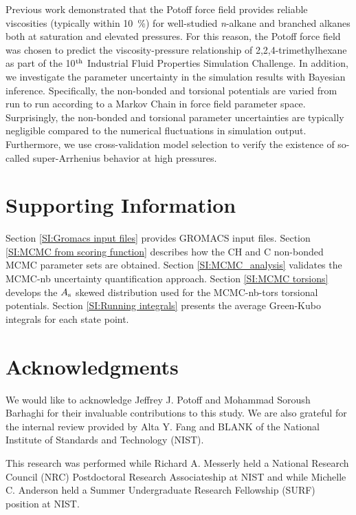 \documentclass[preprint,review,12pt]{elsarticle}
\begin{document}
    Previous work demonstrated that the Potoff force field provides reliable viscosities (typically within 10~\%) for well-studied \textit{n}-alkane and branched alkanes both at saturation and elevated pressures. For this reason, the Potoff force field was chosen to predict the viscosity-pressure relationship of 2,2,4-trimethylhexane as part of the 10$^{\rm th}$ Industrial Fluid Properties Simulation Challenge. In addition, we investigate the parameter uncertainty in the simulation results with Bayesian inference. Specifically, the non-bonded and torsional potentials are varied from run to run according to a Markov Chain in force field parameter space. Surprisingly, the non-bonded and torsional parameter uncertainties are typically negligible compared to the numerical fluctuations in simulation output. Furthermore, we use cross-validation model selection to verify the existence of so-called super-Arrhenius behavior at high pressures.
	
	\section*{Supporting Information}
	
    Section \ref{SI:Gromacs input files} provides GROMACS input files. Section \ref{SI:MCMC from scoring function} describes how the CH and C non-bonded MCMC parameter sets are obtained. Section \ref{SI:MCMC_analysis} validates the MCMC-nb uncertainty quantification approach. Section \ref{SI:MCMC torsions} develops the $A_{\rm s}$ skewed distribution used for the MCMC-nb-tors torsional potentials. Section \ref{SI:Running integrals} presents the average Green-Kubo integrals for each state point.      
	
	\section*{Acknowledgments}
	
	We would like to acknowledge Jeffrey J. Potoff and Mohammad Soroush Barhaghi for their invaluable contributions to this study. We are also grateful for the internal review provided by Alta Y. Fang and BLANK of the National Institute of Standards and Technology (NIST). 
	
	This research was performed while Richard A. Messerly held a National Research Council (NRC) Postdoctoral Research Associateship at NIST and while Michelle C. Anderson held a Summer Undergraduate Research Fellowship (SURF) position at NIST. 
\end{document}
